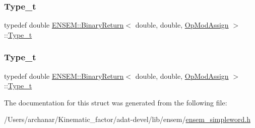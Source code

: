 \mbox{\label{structENSEM_1_1BinaryReturn_3_01double_00_01double_00_01OpModAssign_01_4_a5d4ff64f4601dee1ca69a78e3ed694e0}} 
\subsubsection{\texorpdfstring{Type\_t}{Type\_t}\hspace{0.1cm}{\footnotesize\ttfamily [2/3]}}
{\footnotesize\ttfamily typedef double \mbox{\hyperlink{structENSEM_1_1BinaryReturn}{E\+N\+S\+E\+M\+::\+Binary\+Return}}$<$ double, double, \mbox{\hyperlink{structENSEM_1_1OpModAssign}{Op\+Mod\+Assign}} $>$\+::\mbox{\hyperlink{structENSEM_1_1BinaryReturn_3_01double_00_01double_00_01OpModAssign_01_4_a5d4ff64f4601dee1ca69a78e3ed694e0}{Type\+\_\+t}}}

\mbox{\label{structENSEM_1_1BinaryReturn_3_01double_00_01double_00_01OpModAssign_01_4_a5d4ff64f4601dee1ca69a78e3ed694e0}} 
\subsubsection{\texorpdfstring{Type\_t}{Type\_t}\hspace{0.1cm}{\footnotesize\ttfamily [3/3]}}
{\footnotesize\ttfamily typedef double \mbox{\hyperlink{structENSEM_1_1BinaryReturn}{E\+N\+S\+E\+M\+::\+Binary\+Return}}$<$ double, double, \mbox{\hyperlink{structENSEM_1_1OpModAssign}{Op\+Mod\+Assign}} $>$\+::\mbox{\hyperlink{structENSEM_1_1BinaryReturn_3_01double_00_01double_00_01OpModAssign_01_4_a5d4ff64f4601dee1ca69a78e3ed694e0}{Type\+\_\+t}}}



The documentation for this struct was generated from the following file\+:\begin{DoxyCompactItemize}
\item 
/\+Users/archanar/\+Kinematic\+\_\+factor/adat-\/devel/lib/ensem/\mbox{\hyperlink{adat-devel_2lib_2ensem_2ensem__simpleword_8h}{ensem\+\_\+simpleword.\+h}}\end{DoxyCompactItemize}
